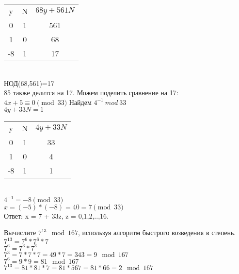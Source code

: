 \documentclass[12pt]{extreport}
\theoremstyle{definiton}
\theoremstyle{definition}
\theoremstyle{definition}
\def\prend{
	\bigskip
}
\begin{document}
	\begin{tabular}{ |c|c|c| } 
    \hline
    y & N & $ 68y+561N$ \\ 
    0 & 1 & 561 \\ 
    1 & 0 & 68 \\ 
    -8 & 1 & 17 \\ 
    \hline
    \end{tabular}
	\newline
	\\НОД(68,561)=17
	\\85 также делится на 17. Можем поделить сравнение на 17:
	\\$4x+5\equiv 0 \pmod{33}$
	\newline Найдем $4^{-1}\ mod\ 33$
	\\$4y+33N=1$
	
	\begin{tabular}{ |c|c|c| } 
    \hline
    y & N & $ 4y+33N$ \\ 
    0 & 1 & 33 \\ 
    1 & 0 & 4 \\ 
    -8 & 1 & 1 \\ 
    \hline
    \end{tabular}
    \newline
    \\$4^{-1}=-8\pmod{33}$
    \\$x=(-5)*(-8)=40=7\pmod{33}$
    \\Ответ: x = 7 + 33z, z = 0,1,2,..,16.
	\prend

	\Pr[2] Вычислите $7^{13} \mod 167$, используя алгоритм быстрого возведения в степень.
    \newline
    \\$7^{13}=7^{6}*7^{6}*7$
    \\$7^{6}=7^{3}*7^{3}$
    \\$7^{3}=7*7*7=49*7=343=9\mod 167$
    \\$7^{6}=9*9=81\mod 167$
    \\$7^{13}=81*81*7=81*567=81*66=2\mod 167$
	\prend
\end{document}
